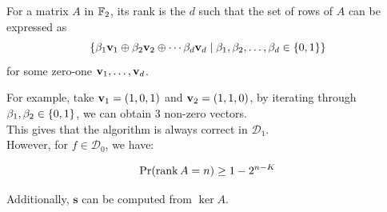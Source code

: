 \begin{definition}
    For a matrix $A$ in $\mathbb{F}_2$, its rank is the  $d$ such that the set of rows of $A$ can be expressed as 
    $$\{\beta_1 \mathbf{v}_1 \oplus \beta_2 \mathbf{v}_2 \oplus \cdots \beta_d \mathbf{v}_d \mid \beta_1, \beta_2, \dots, \beta_d \in \{0, 1\}\}$$
    for some zero-one $\mathbf{v}_1, \dots, \mathbf{v}_d$.
\end{definition}
For example, take $\mathbf{v}_1 = (1, 0, 1)$ and $\mathbf{v}_2 = (1, 1, 0)$, by iterating through $\beta_1, \beta_2 \in \{0, 1\}$, we can obtain $3$ non-zero vectors. \\
This gives that the algorithm is always correct in $\mathcal{D}_1$. \\
However, for $f \in \mathcal{D}_0$, we have:
\begin{lemma}
    $$\text{Pr}(\rank A = n) \ge 1 - 2^{n - K}$$
\end{lemma}
Additionally, $\mathbf{s}$ can be computed from $\ker A$.

\newpage